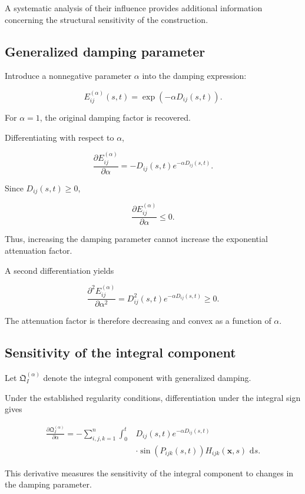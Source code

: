 \documentclass[12pt]{article}
\numberwithin{equation}{section}
\newcommand{\Q}{\mathfrak{Q}}
\newcommand{\dd}{\,\mathrm{d}}
\theoremstyle{definition}
\theoremstyle{remark}
\begin{document}
A systematic analysis of their influence
provides additional information concerning
the structural sensitivity of the construction.

\subsection{Generalized damping parameter}

Introduce a nonnegative parameter
\(\alpha\) into the damping expression:

\[
E_{ij}^{(\alpha)}(s,t)
=
\exp(-\alpha D_{ij}(s,t)).
\]

For \(\alpha=1\), the original damping
factor is recovered.

Differentiating with respect to \(\alpha\),

\[
\frac{\partial E_{ij}^{(\alpha)}}
{\partial\alpha}
=
-D_{ij}(s,t)
e^{-\alpha D_{ij}(s,t)}.
\]

Since \(D_{ij}(s,t)\geq0\),

\[
\frac{\partial E_{ij}^{(\alpha)}}
{\partial\alpha}
\leq0.
\]

Thus, increasing the damping parameter
cannot increase the exponential attenuation
factor.

A second differentiation yields

\[
\frac{\partial^2 E_{ij}^{(\alpha)}}
{\partial\alpha^2}
=
D_{ij}^2(s,t)
e^{-\alpha D_{ij}(s,t)}
\geq0.
\]

The attenuation factor is therefore
decreasing and convex as a function
of \(\alpha\).

\subsection{Sensitivity of the integral component}

Let \(\Q_I^{(\alpha)}\) denote the integral
component with generalized damping.

Under the established regularity conditions,
differentiation under the integral sign gives

\[
\begin{aligned}
\frac{\partial\Q_I^{(\alpha)}}{\partial\alpha}
=
-\sum_{i,j,k=1}^{n}
\int_0^t
&D_{ij}(s,t)
e^{-\alpha D_{ij}(s,t)}
\\
&\cdot
\sin(P_{ijk}(s,t))
H_{ijk}(\mathbf{x},s)
\,\dd s.
\end{aligned}
\]

This derivative measures the sensitivity
of the integral component to changes
in the damping parameter.
\end{document}
